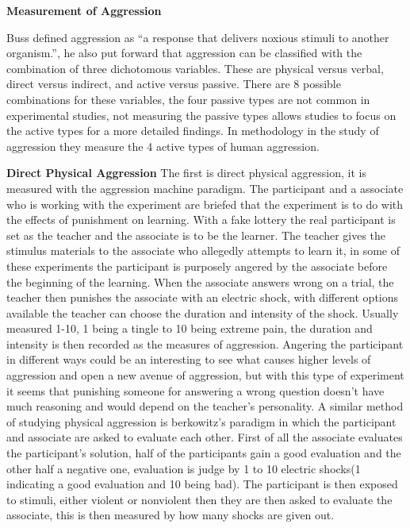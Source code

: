 \documentclass[journal]{IEEEtran}
\begin{document}
        \textbf{Measurement of Aggression}
        
                Buss defined aggression as “a response that delivers noxious stimuli to another organism.”\cite{Buss}, he also put forward that aggression can be classified with the combination of three dichotomous variables. These are physical versus verbal, direct versus indirect, and active versus passive. There are 8 possible combinations for these variables, the four passive types are not common in experimental studies\cite{Bushman}, not measuring the passive types allows studies to focus on the active types for a more detailed findings. In methodology in the study of aggression they measure the 4 active types of human aggression. 

    \textbf{Direct Physical Aggression}
        The first is direct physical aggression, it is measured with the aggression machine paradigm\cite{Buss}. The participant and a associate who is working with the experiment are briefed that the experiment is to do with the effects of punishment on learning. With a fake lottery the real participant is set as the teacher and the associate is to be the learner. The teacher gives the stimulus materials to the associate who allegedly attempts to learn it, in some of these experiments the participant is purposely angered by the associate before the beginning of the learning. When the associate answers wrong on a trial, the teacher then punishes the associate with an electric shock, with different options available the teacher can choose the duration and intensity of the shock. Usually measured 1-10, 1 being a tingle to 10 being extreme pain, the duration and intensity is then recorded as the measures of aggression. Angering the participant in different ways could be an interesting to see what causes higher levels of aggression and open a new avenue of aggression, but with this type of experiment it seems that punishing someone for answering a wrong question doesn't have much reasoning and would depend on the teacher's personality.
        A similar method of studying physical aggression is berkowitz’s paradigm in which the participant and associate are asked to evaluate each other\cite{Berkowitz}. First of all the associate evaluates the participant's solution, half of the participants gain a good evaluation and the other half a negative one, evaluation is judge by 1 to 10 electric shocks(1 indicating a good evaluation and 10 being bad). The participant is then exposed to stimuli, either violent or nonviolent then they are then asked to evaluate the associate, this is then measured by how many shocks are given out. 
\end{document}
